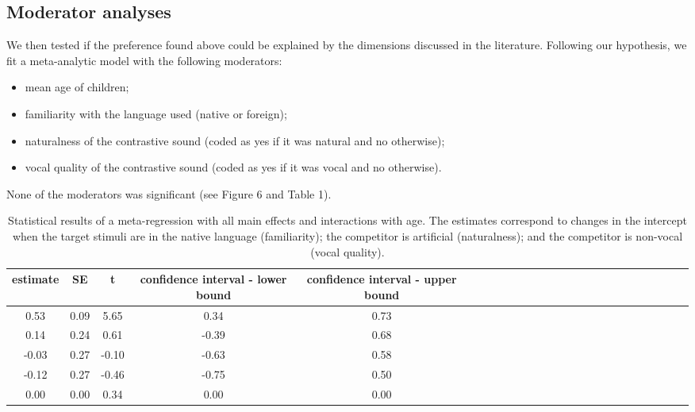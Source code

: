 \documentclass[man,floatsintext]{apa6}
\providecommand{\tightlist}{%
  \setlength{\itemsep}{0pt}\setlength{\parskip}{0pt}}
\begin{document}
\subsection{Moderator analyses}\label{moderator-analyses}

We then tested if the preference found above could be explained by the
dimensions discussed in the literature. Following our hypothesis, we fit
a meta-analytic model with the following moderators:

\begin{itemize}
\tightlist
\item
  mean age of children;
\item
  familiarity with the language used (native or foreign);
\item
  naturalness of the contrastive sound (coded as yes if it was natural
  and no otherwise);
\item
  vocal quality of the contrastive sound (coded as yes if it was vocal
  and no otherwise).
\end{itemize}

None of the moderators was significant (see Figure 6 and Table 1).

\begin{table}[tbp]
\begin{center}
\begin{threeparttable}
\caption{\label{tab:Table1}Statistical results of a meta-regression with all main effects and interactions with age. The estimates correspond to changes in the intercept when the target stimuli are in the native language (familiarity); the competitor is artificial (naturalness); and the competitor is non-vocal (vocal quality).}
\begin{tabular}{ccccccccccccccccccccccccc}
\toprule
estimate & SE & t & confidence interval - lower bound & confidence interval - upper bound\\
\midrule
0.53 & 0.09 & 5.65 & 0.34 & 0.73\\
0.14 & 0.24 & 0.61 & -0.39 & 0.68\\
-0.03 & 0.27 & -0.10 & -0.63 & 0.58\\
-0.12 & 0.27 & -0.46 & -0.75 & 0.50\\
0.00 & 0.00 & 0.34 & 0.00 & 0.00\\
\bottomrule
\end{tabular}
\end{threeparttable}
\end{center}
\end{table}
\end{document}
